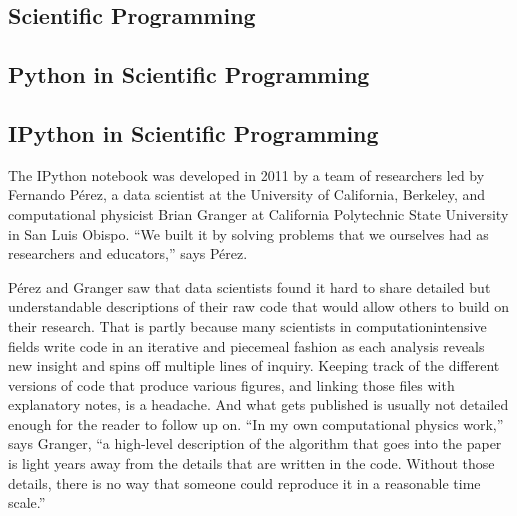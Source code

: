 \subsection{Scientific Programming}
\subsection{Python in Scientific Programming}
\subsection{IPython in Scientific Programming}

The IPython notebook was developed in 2011
by a team of researchers led by Fernando Pérez,
a data scientist at the University of California,
Berkeley, and computational physicist Brian
Granger at California Polytechnic State University
in San Luis Obispo. “We built it by solving
problems that we ourselves had as researchers
and educators,” says Pérez.

Pérez and Granger saw that data scientists
found it hard to share detailed but understandable
descriptions of their raw code that would
allow others to build on their research. That is
partly because many scientists in computationintensive
fields write code in an iterative and
piecemeal fashion as each analysis reveals new
insight and spins off multiple lines of inquiry.
Keeping track of the different versions of code
that produce various figures, and linking those
files with explanatory notes, is a headache.
And what gets published is usually not detailed
enough for the reader to follow up on. “In my
own computational physics work,” says Granger,
“a high-level description of the algorithm that
goes into the paper is light years away from
the details that are written in the code. Without
those details, there is no way that someone
could reproduce it in a reasonable time scale.”

